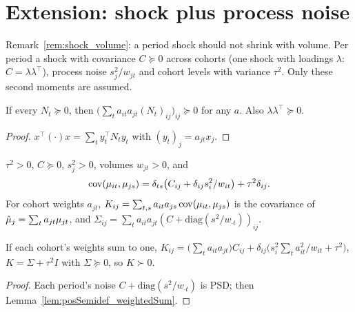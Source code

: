 \chapter{Extension: shock plus process noise}\label{ch:shock}

Remark~\ref{rem:shock_volume}: a period shock should not shrink with volume. Per period a
shock with covariance $C \succeq 0$ across cohorts (one shock with loadings $\lambda$:
$C = \lambda\lambda^\top$), process noise $s_j^2/w_{jt}$ and cohort levels with variance
$\tau^2$. Only these second moments are assumed.

\begin{lemma}\label{lem:posSemidef_weightedSum}
  \leanok
  If every $N_t \succeq 0$, then $\bigl(\sum_t a_{it}a_{jt}(N_t)_{ij}\bigr)_{ij} \succeq 0$
  for any $a$. Also $\lambda\lambda^\top \succeq 0$.
\end{lemma}
\begin{proof}
  \leanok
  $x^\top(\cdot)x = \sum_t y_t^\top N_t y_t$ with $(y_t)_j = a_{jt}x_j$.
\end{proof}

\begin{definition}\label{def:Shock}
  \leanok
  $\tau^2 > 0$, $C \succeq 0$, $s_j^2 > 0$, volumes $w_{jt} > 0$, and
  \[
    \operatorname{cov}(\mu_{it}, \mu_{js}) = \delta_{ts}\bigl(C_{ij} + \delta_{ij}s_i^2/w_{it}\bigr)
      + \tau^2\delta_{ij}.
  \]
  For cohort weights $a_{jt}$, $K_{ij} = \sum_{t,s} a_{it}a_{js}\operatorname{cov}(\mu_{it}, \mu_{js})$
  is the covariance of $\hat\mu_j = \sum_t a_{jt}\mu_{jt}$, and
  $\Sigma_{ij} = \sum_t a_{it}a_{jt}(C + \mathrm{diag}(s^2/w_{\cdot t}))_{ij}$.
\end{definition}

\begin{theorem}\label{thm:Shock_K}
  \leanok
  If each cohort's weights sum to one,
  $K_{ij} = \bigl(\sum_t a_{it}a_{jt}\bigr)C_{ij}
    + \delta_{ij}\bigl(s_i^2\sum_t a_{it}^2/w_{it} + \tau^2\bigr)$, $K = \Sigma + \tau^2 I$
  with $\Sigma \succeq 0$, so $K \succ 0$.
\end{theorem}
\begin{proof}
  \leanok
  Each period's noise $C + \mathrm{diag}(s^2/w_{\cdot t})$ is PSD; then
  Lemma~\ref{lem:posSemidef_weightedSum}.
\end{proof}

